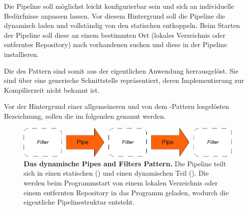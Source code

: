 Die Pipeline soll möglichst leicht konfigurierbar sein und sich an
individuelle Bedürfnisse anpassen lassen.
Vor diesem Hintergrund soll die Pipeline die  dynamisch laden und
vollständig von den statischen  entkoppeln.
Beim Starten der Pipeline soll diese an einem bestimmten Ort (lokales
Verzeichnis oder entferntes Repository) nach vorhandenen  suchen
und diese in der Pipeline installieren.

Die  des  Pattern sind somit aus der
eigentlichen Anwendung herrausgelöst. Sie sind über eine generische
Schnittstelle repräsentiert, deren Implementierung zur Kompilierzeit nicht
bekannt ist.

Vor der Hintergrund einer allgemeineren und von dem -Pattern losgelösten Bezeichnung, sollen die  im folgenden
 genannt werden.

\begin{figure}[htbp]
	\begin{center}
		\includegraphics[scale=0.7]{pics/pipesFilter21.png}
	\caption[Dynamisches Pipes and Filter Pattern]{
	\textbf{Das dynamische Pipes and Filters Pattern.}
	Die Pipeline teilt sich in einen statischen () und einen
	dynamischen Teil ().
	Die  werden beim Programmstart von einem lokalen Verzeichnis oder
	einem entfernten Repository in das Programm geladen, wodurch die eigentliche
	Pipelinestruktur entsteht.
	}
	\end{center}
	\label{fig:pipesFilter21}
\end{figure}

